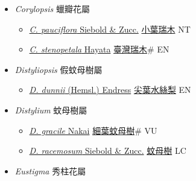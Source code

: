 
  \begin{itemize}
 \item[] \textit{Corylopsis} 蠟瓣花屬
                    
  \begin{itemize}
        \item[] \href{http://www.theplantlist.org/tpl1.1/search?q=Corylopsis+pauciflora}{\textit{C. pauciflora} Siebold \& Zucc.}   \href{\detokenize{http://taibnet.sinica.edu.tw/chi/taibnet_species_list.php?T2=小葉瑞木&T2_new_value=true&fr=y}}{小葉瑞木} NT
        \item[] \href{http://www.theplantlist.org/tpl1.1/search?q=Corylopsis+stenopetala}{\textit{C. stenopetala} Hayata}   \href{\detokenize{http://taibnet.sinica.edu.tw/chi/taibnet_species_list.php?T2=臺灣瑞木&T2_new_value=true&fr=y}}{臺灣瑞木}\# EN
  \end{itemize}
 \item[] \textit{Distyliopsis} 假蚊母樹屬
                    
  \begin{itemize}
        \item[] \href{http://www.theplantlist.org/tpl1.1/search?q=Distyliopsis+dunnii}{\textit{D. dunnii} (Hemsl.) Endress}   \href{\detokenize{http://taibnet.sinica.edu.tw/chi/taibnet_species_list.php?T2=尖葉水絲梨&T2_new_value=true&fr=y}}{尖葉水絲梨} EN
  \end{itemize}
 \item[] \textit{Distylium} 蚊母樹屬
                    
  \begin{itemize}
        \item[] \href{http://www.theplantlist.org/tpl1.1/search?q=Distylium+gracile}{\textit{D. gracile} Nakai}   \href{\detokenize{http://taibnet.sinica.edu.tw/chi/taibnet_species_list.php?T2=細葉蚊母樹&T2_new_value=true&fr=y}}{細葉蚊母樹}\# VU
        \item[] \href{http://www.theplantlist.org/tpl1.1/search?q=Distylium+racemosum}{\textit{D. racemosum} Siebold \& Zucc.}   \href{\detokenize{http://taibnet.sinica.edu.tw/chi/taibnet_species_list.php?T2=蚊母樹&T2_new_value=true&fr=y}}{蚊母樹} LC
  \end{itemize}
 \item[] \textit{Eustigma} 秀柱花屬
                    

\end{itemize}

